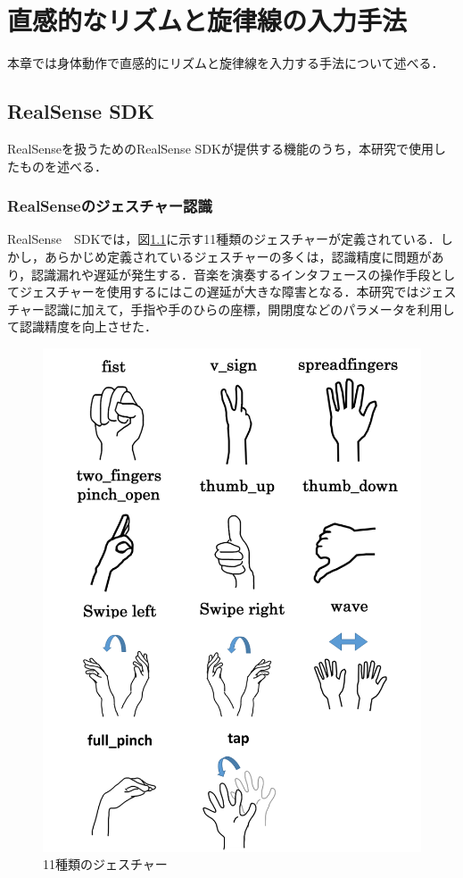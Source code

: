 \chapter{直感的なリズムと旋律線の入力手法}
本章では身体動作で直感的にリズムと旋律線を入力する手法について述べる．

\section{RealSense SDK}
RealSenseを扱うためのRealSense SDKが提供する機能のうち，本研究で使用したものを述べる．
\subsection{RealSenseのジェスチャー認識}
RealSense　SDKでは，図\ref{img:jesture}に示す11種類のジェスチャーが定義されている．しかし，あらかじめ定義されているジェスチャーの多くは，認識精度に問題があり，認識漏れや遅延が発生する．音楽を演奏するインタフェースの操作手段としてジェスチャーを使用するにはこの遅延が大きな障害となる．本研究ではジェスチャー認識に加えて，手指や手のひらの座標，開閉度などのパラメータを利用して認識精度を向上させた．
\begin{figure}[t]
	\begin{center}
		\includegraphics[width=0.9\linewidth]{assets/img/jesture.png}
		\caption{11種類のジェスチャー}
		\label{img:jesture}
	\end{center}
\end{figure}

